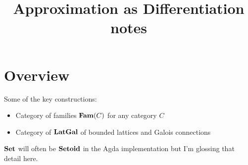 \documentclass[acmsmall,nonacm]{acmart}
\begin{document}
\title{Approximation as Differentiation notes}
\maketitle

\section{Overview}

Some of the key constructions:
\begin{itemize}
\item Category of families $\mathbf{Fam}(C)$ for any category $C$
\item Category of $\mathbf{LatGal}$ of bounded lattices and Galois connections
\end{itemize}

\noindent $\mathbf{Set}$ will often be $\mathbf{Setoid}$ in the Agda implementation but I'm glossing that detail here.


% 
\end{document}
